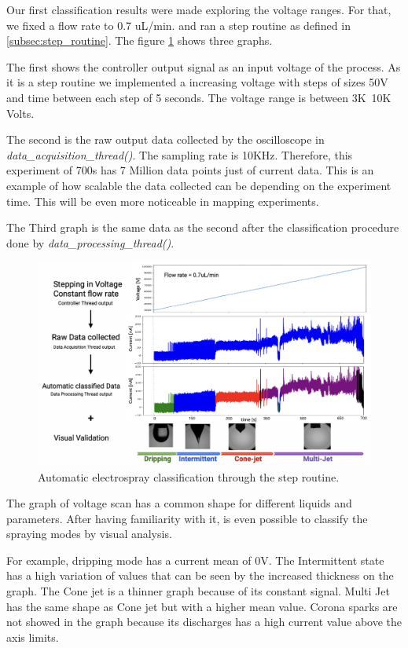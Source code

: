 Our first classification results were made exploring the voltage ranges. 
For that, we fixed a flow rate to 0.7 uL/min. and ran a step routine as defined in \ref{subsec:step_routine}. 
The figure \ref{fig:step_class} shows three graphs. 

The first shows the controller output signal as an input voltage of the process. As it is a step routine we implemented a increasing voltage with steps of sizes 50V and time between each step of 5 seconds. The voltage range is between 3K~10K Volts.

The second is the raw output data collected by the oscilloscope in \emph{data\_acquisition\_thread()}. 
The sampling rate is 10KHz. Therefore, this experiment of 700s has 7 Million data points just of current data. 
This is an example of how scalable the data collected can be depending on the experiment time. This will be even more noticeable in mapping experiments.

The Third graph is the same data as the second after the classification procedure done by \emph{data\_processing\_thread()}. 


\begin{figure}[H]
    \center
    \includegraphics[width=16cm]{Figuras/may/step_class.png}
    \caption{Automatic electrospray classification through the step routine.}
    \label{fig:step_class}
\end{figure}

The graph of voltage scan has a common shape for different liquids and parameters. After having familiarity with it, is even possible to classify the spraying modes by visual analysis. 

For example, dripping mode has a current mean of 0V. The Intermittent state has a high variation of values that can be seen by the increased thickness on the graph. The Cone jet is a thinner graph because of its constant signal. Multi Jet  has the same shape as Cone jet but with a higher mean value. Corona sparks are not showed in the graph because its discharges has a high current value above the axis limits.



